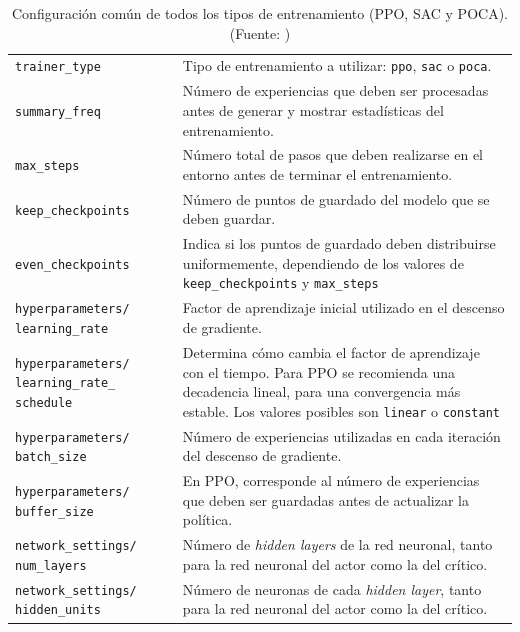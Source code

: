 \begin{table}[H]
\centering
    \begin{tabular}{|>{\rowmac}p{3.5cm}|>{\rowmac}p{10cm}<{\clearrow}|} 
        \hline
        \multicolumn{1}{|c|}{\textbf{Ajuste}} & \multicolumn{1}{c|}{\textbf{Descripción}} \\ \hline \hline
        \texttt{trainer\_type} & Tipo de entrenamiento a utilizar: \texttt{ppo}, \texttt{sac} o \texttt{poca}. \\
        \hline
        \texttt{summary\_freq} & Número de experiencias que deben ser procesadas antes de generar y mostrar estadísticas del entrenamiento. \\
        \hline
        \texttt{max\_steps} & Número total de pasos que deben realizarse en el entorno antes de terminar el entrenamiento. \\
        \hline
        \texttt{keep\_checkpoints} & Número de puntos de guardado del modelo que se deben guardar. \\
        \hline
        \texttt{even\_checkpoints} & Indica si los puntos de guardado deben distribuirse uniformemente, dependiendo de los valores de \texttt{keep\_checkpoints} y \texttt{max\_steps} \\
        \hline
        \texttt{hyperparameters/ learning\_rate} & Factor de aprendizaje inicial utilizado en el descenso de gradiente. \\
        \hline
        \texttt{hyperparameters/ learning\_rate\_ schedule} & Determina cómo cambia el factor de aprendizaje con el tiempo. Para PPO se recomienda una decadencia lineal, para una convergencia más estable. Los valores posibles son \texttt{linear} o \texttt{constant}\\
        \hline
        \texttt{hyperparameters/ batch\_size} & Número de experiencias utilizadas en cada iteración del descenso de gradiente. \\
        \hline
        \texttt{hyperparameters/ buffer\_size} & En PPO, corresponde al número de experiencias que deben ser guardadas antes de actualizar la política. \\
        \hline
        \texttt{network\_settings/ num\_layers} & Número de \emph{hidden layers} de la red neuronal, tanto para la red neuronal del actor como la del crítico. \\
        \hline
        \texttt{network\_settings/ hidden\_units} & Número de neuronas de cada \emph{hidden layer}, tanto para la red neuronal del actor como la del crítico. \\
        \hline
    \end{tabular}
    \caption[Configuración común de todos los tipos de entrenamiento (PPO, SAC y POCA)]{Configuración común de todos los tipos de entrenamiento (PPO, SAC y POCA). (Fuente: \cite{ml-agents-config-file})}
    \label{tab:config-general}
\end{table}

